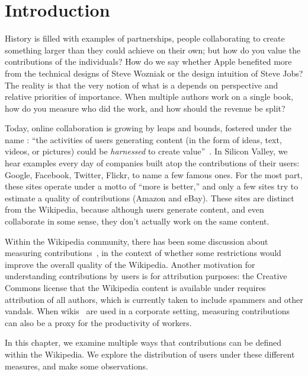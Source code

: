 
\section{Introduction}

History is filled with examples of partnerships, people collaborating
to create something larger than they could achieve on their own;
but how do you value the contributions of the individuals?
How do we say whether Apple benefited more from the technical
designs of Steve Wozniak or the design intuition of Steve Jobs?
The reality is that the very notion of what is a 
depends on perspective and relative priorities of importance.
When multiple authors work on a single book, how do you measure
who did the work, and how should the revenue be split?

Today, online collaboration is growing by leaps and bounds,
fostered under the name : ``the activities of
users generating content (in the form of ideas, text,
videos, or pictures) could be \textit{harnessed} to
create value''~\cite{wiki:Web20}.
In Silicon Valley, we hear examples every day of companies
built atop the contributions of their users:
Google, Facebook, Twitter, Flickr, to name a few famous ones.
For the most part, these sites operate under a motto
of ``more is better,'' and only a few sites try to estimate
a quality of contributions (\eg Amazon and eBay).
These sites are distinct from the Wikipedia, because although
users generate content, and even collaborate in some sense,
they don't actually work on the same content.

Within the Wikipedia community, there has been some discussion
about measuring contributions~\cite{Wales2005,Swartz2006},
in the context of whether some restrictions would improve
the overall quality of the Wikipedia.
Another motivation for understanding contributions by
users is for attribution purposes: the Creative Commons license
that the Wikipedia content is available under requires attribution
of all authors, which is currently taken to include spammers
and other vandals.
When wikis~\cite{Leuf2001} are used in a corporate setting,
measuring contributions can also be a proxy for the productivity
of workers.

In this chapter, we examine multiple ways that contributions
can be defined within the Wikipedia.
We explore the distribution of users under these different measures,
and make some observations.

